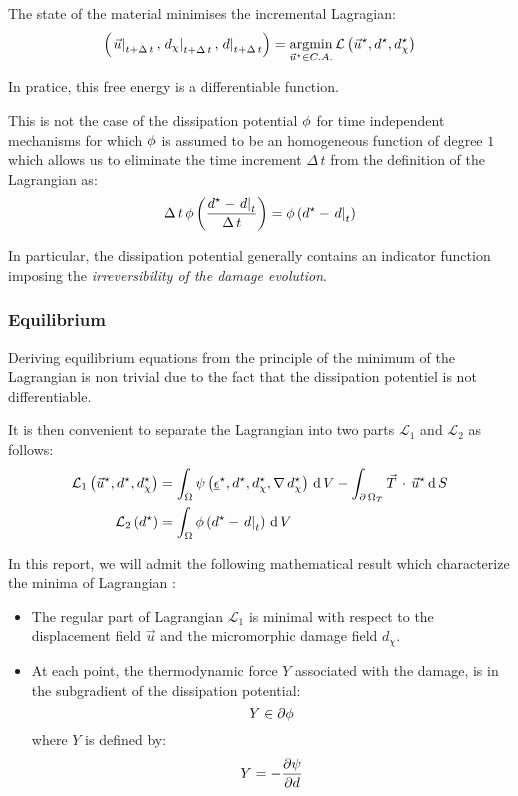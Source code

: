 The state of the material minimises the incremental Lagragian:
\[
\left(\left.\vec{u}\right|_{t+\Delta\,t}, \left.d_{\chi}\right|_{t+\Delta\,t}, \left.d\right|_{t+\Delta\,t}\right) = \underset{\vec{u}^{\star}\in C.A.}{\mathrm{argmin}}\, \mathcal{L}\left(\vec{u}^{\star},d^{\star},d_{\chi}^{\star}\right)
\]

In pratice, this free energy is a differentiable function.

This is not the case of the dissipation potential
\(\phi\) for time independent mechanisms for which
\(\phi\) is assumed to be an homogeneous function of
degree \(1\) which allows us to eliminate the time increment
\(\Delta\,t\) from the definition of the Lagrangian as:
\[
\Delta\,t\,\phi\left(\displaystyle \frac{\displaystyle d^{\star}-\left.d\right|_{t}}{\displaystyle \Delta\,t}\right) = \phi\left(d^{\star}-\left.d\right|_{t}\right)
\]

In particular, the dissipation potential generally contains an indicator
function imposing the \textit{irreversibility of the damage evolution}.

\subsubsection{Equilibrium}

Deriving equilibrium equations from the principle of the minimum of the
Lagrangian is non trivial due to the fact that the dissipation potentiel
is not differentiable.

It is then convenient to separate the Lagrangian into two parts
\(\mathcal{L}_{1}\) and \(\mathcal{L}_{2}\) as follows:
\[
\begin{aligned}
\mathcal{L}_{1}\left(\vec{u}^{\star},d^{\star},d_{\chi}^{\star}\right) &= 
\int_{\Omega}
\psi\left(\underline{\epsilon}^{\star}, d^{\star}, d_{\chi}^{\star},\nabla\,d_{\chi}^{\star}\right)
\,\mathrm{d}\,V -
\int_{\partial\,\Omega_{T}} \vec{T}\,\cdot\,\vec{u}^{\star} \,\mathrm{d}\,S \\
\mathcal{L}_{2}\left(d^{\star}\right) &= 
\int_{\Omega}
\phi\left(d^{\star}-\left.d\right|_{t}\right)
\,\mathrm{d}\,V
\end{aligned}
\]

In this report, we will admit the following mathematical result which
characterize the minima of Lagrangian \cite{son_standard_2021}:

\begin{itemize}
    \item The regular part of Lagrangian \(\mathcal{L}_{1}\) is minimal with
    respect to the displacement field \(\vec{u}\) and the micromorphic
    damage field \(d_{\chi}\).
    \item At each point, the thermodynamic force \(Y\) associated with the
    damage, is in the subgradient of the dissipation potential:
    \[
    Y \in \partial \phi
    \]
    where \(Y\) is defined by:
    \[
    Y = -\displaystyle \frac{\displaystyle \partial \psi}{\displaystyle \partial d}
    \]
\end{itemize}

